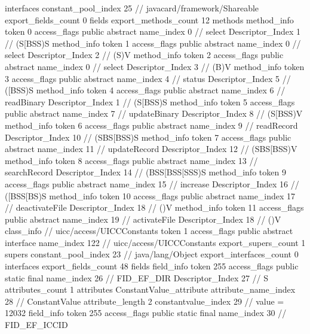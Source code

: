 {{{			interfaces {
				constant_pool_index	25		// javacard/framework/Shareable
			}
			export_fields_count	0
			fields {
			}
			export_methods_count	12
			methods {
				method_info {
					token	0
					access_flags	public abstract
					name_index	0		// select
					Descriptor_Index	1		// (S[BSS)S
				}
				method_info {
					token	1
					access_flags	public abstract
					name_index	0		// select
					Descriptor_Index	2		// (S)V
				}
				method_info {
					token	2
					access_flags	public abstract
					name_index	0		// select
					Descriptor_Index	3		// (B)V
				}
				method_info {
					token	3
					access_flags	public abstract
					name_index	4		// status
					Descriptor_Index	5		// ([BSS)S
				}
				method_info {
					token	4
					access_flags	public abstract
					name_index	6		// readBinary
					Descriptor_Index	1		// (S[BSS)S
				}
				method_info {
					token	5
					access_flags	public abstract
					name_index	7		// updateBinary
					Descriptor_Index	8		// (S[BSS)V
				}
				method_info {
					token	6
					access_flags	public abstract
					name_index	9		// readRecord
					Descriptor_Index	10		// (SBS[BSS)S
				}
				method_info {
					token	7
					access_flags	public abstract
					name_index	11		// updateRecord
					Descriptor_Index	12		// (SBS[BSS)V
				}
				method_info {
					token	8
					access_flags	public abstract
					name_index	13		// searchRecord
					Descriptor_Index	14		// (BSS[BSS[SSS)S
				}
				method_info {
					token	9
					access_flags	public abstract
					name_index	15		// increase
					Descriptor_Index	16		// ([BSS[BS)S
				}
				method_info {
					token	10
					access_flags	public abstract
					name_index	17		// deactivateFile
					Descriptor_Index	18		// ()V
				}
				method_info {
					token	11
					access_flags	public abstract
					name_index	19		// activateFile
					Descriptor_Index	18		// ()V
				}
			}
		}
		class_info {		// uicc/access/UICCConstants
			token	1
			access_flags	public abstract interface
			name_index	122		// uicc/access/UICCConstants
			export_supers_count	1
			supers {
				constant_pool_index	23		// java/lang/Object
			}
			export_interfaces_count	0
			interfaces {
			}
			export_fields_count	48
			fields {
			field_info {
				token	255
				access_flags	public static final
				name_index	26		// FID_EF_DIR
				Descriptor_Index	27		// S
				attributes_count	1
				attributes {
				ConstantValue_attribute {
					attribute_name_index	28		// ConstantValue
					attribute_length	2
					constantvalue_index	29		// value = 12032
				}
				}
			}
			field_info {
				token	255
				access_flags	public static final
				name_index	30		// FID_EF_ICCID
}}}}}
